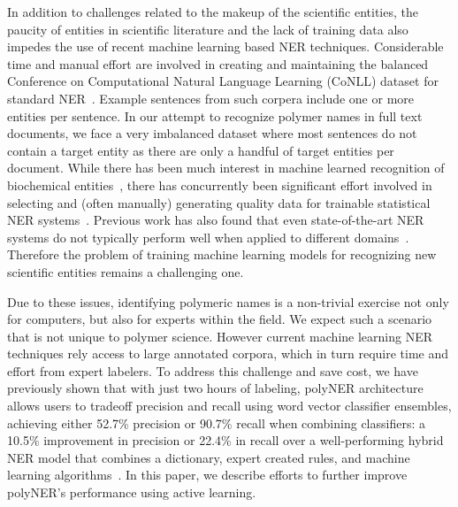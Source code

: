 In addition to challenges related to the makeup of the scientific entities, the paucity of entities in scientific literature and the lack of training data also impedes the use of recent machine learning based NER techniques.
Considerable time and manual effort are involved in creating and maintaining the balanced
Conference on Computational Natural Language Learning (CoNLL) dataset for standard NER~\cite{tjong2003introduction}.
Example sentences from such corpera include one or more entities per sentence. 
In our attempt to recognize polymer names in full text documents, we face a very imbalanced dataset where most sentences do not contain a target entity as there are only a handful of target entities per document.
While there has been much interest in machine learned recognition of biochemical entities~\cite{jessop2011oscar4,rocktaschel2012chemspot,leaman2015tmchem,swain2016chemdataextractor}, there has concurrently been significant effort involved in selecting and (often manually) generating quality data for
trainable statistical NER systems~\cite{krallinger2015chemdner}. 
Previous work has also found that even state-of-the-art NER systems do
not typically perform well when applied to different domains~\cite{krallinger2013overview}. 
Therefore the problem of training machine learning models for recognizing new scientific entities remains a challenging one.

Due to these issues, identifying polymeric names is a non-trivial exercise not only for computers, but also for experts within the field. 
We expect such a scenario that is not unique to polymer science.
However current machine learning NER techniques rely access to large annotated corpora, which in turn require time and effort from expert labelers.
To address this challenge and save cost,
we have previously shown that with just two hours of labeling, polyNER architecture allows users to tradeoff precision and recall using word vector classifier ensembles, achieving
either 52.7\% precision or 90.7\% recall when combining classifiers:
a 10.5\% improvement in precision or 22.4\% in recall over a well-performing hybrid NER model
that combines a dictionary, expert created rules, and machine learning algorithms~\cite{tchoua2019polyner}. 
In this paper, we describe efforts to further improve polyNER's performance using active learning.
\loganfussingaboutrecallandprecision{}